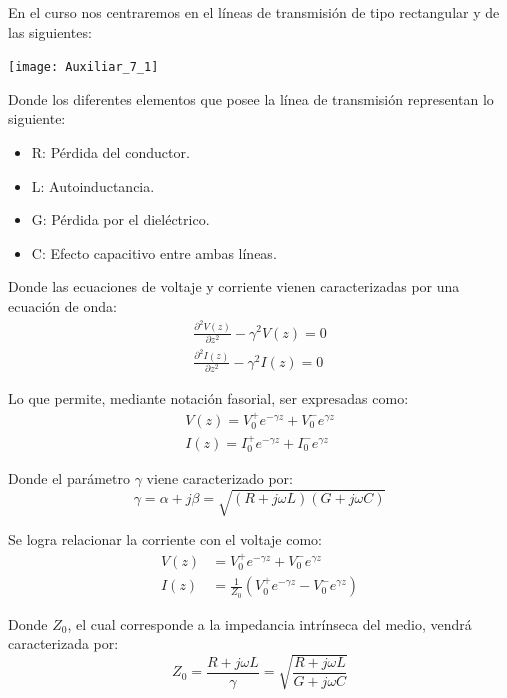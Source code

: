 \documentclass[
  11pt,
  letterpaper,
   addpoints,
   answers
  ]{exam}
\begin{document}
En el curso nos centraremos en el líneas de transmisión de tipo rectangular y de las siguientes:

\begin{center}
    \texttt{[image: Auxiliar\_7\_1]}
\end{center}

Donde los diferentes elementos que posee la línea de transmisión representan lo siguiente:
\begin{itemize}
    \item R: Pérdida del conductor.
    \item L: Autoinductancia.
    \item G: Pérdida por el dieléctrico.
    \item C: Efecto capacitivo entre ambas líneas.
\end{itemize}

Donde las ecuaciones de voltaje y corriente vienen caracterizadas por una ecuación de onda:
\begin{align}
    \frac{\partial^2 V(z)}{\partial z^2} - \gamma^2 V(z) = 0 \tag{1} \\
    \frac{\partial^2 I(z)}{\partial z^2} - \gamma^2 I(z) = 0 \tag{2}
\end{align}

Lo que permite, mediante notación fasorial, ser expresadas como:
\begin{align}
    V(z) = V_0^+ e^{-\gamma z} + V_0^- e^{\gamma z} \tag{3} \\
    I(z) = I_0^+ e^{-\gamma z} + I_0^- e^{\gamma z} \tag{4}
\end{align}

Donde el parámetro $\gamma$ viene caracterizado por:
\begin{equation}
    \gamma = \alpha + j \beta = \sqrt{(R + j\omega L)(G + j\omega C)} \tag{5}
\end{equation}

Se logra relacionar la corriente con el voltaje como:
\begin{align}
    V(z) &= V_0^+ e^{-\gamma z} + V_0^- e^{\gamma z} \tag{6} \\
    I(z) &= \frac{1}{Z_0} \left( V_0^+ e^{-\gamma z} - V_0^- e^{\gamma z} \right) \tag{7}
\end{align}

Donde $Z_0$, el cual corresponde a la impedancia intrínseca del medio, vendrá caracterizada por:
\begin{equation}
    Z_0 = \frac{R + j\omega L}{\gamma} = \sqrt{\frac{R + j\omega L}{G + j\omega C}} \tag{8}
\end{equation}
\end{document}

